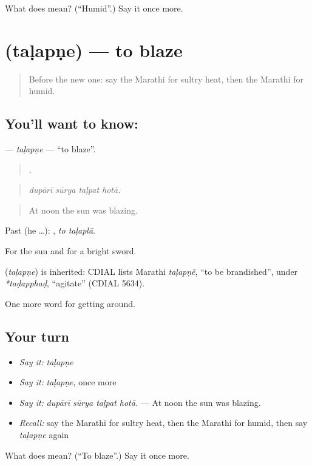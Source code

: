 \begin{tcolorbox}[breakable,colback=teal!4,colframe=teal!35!black,title={Before you move on}]
What does  mean? (\textquotedblleft{}Humid\textquotedblright{}.) Say it once more.
\end{tcolorbox}
\section[\texorpdfstring{\mr{तळपणे} (taḷapṇe)}{तळपणे (taḷapṇe)}]{ (taḷapṇe) — to blaze}

\label{lesson:MR-C436-talapne}



\begin{quote}
Before the new one: say the Marathi for sultry heat, then the Marathi for humid.
\end{quote}

\subsection*{You'll want to know: }
\textbf{} — \emph{taḷapṇe} — \textquotedblleft{}to blaze\textquotedblright{}.

\begin{quote}
   .
\end{quote}

\begin{quote}
\emph{dupārī sūrya taḷpat hotā.}
\end{quote}

\begin{quote}
At noon the sun was blazing.
\end{quote}

Past (he …):  , \emph{to taḷaplā}.

For the sun and for a bright sword.

\begin{cousinweb}
\textbf{} (\emph{taḷapṇe}) is inherited: CDIAL lists Marathi \emph{taḷapṇẽ}, \textquotedblleft{}to be brandished\textquotedblright{}, under \emph{*taḍapphaḍ}, \textquotedblleft{}agitate\textquotedblright{} (CDIAL 5634).
\end{cousinweb}

\begin{grammarlens}[title={What you've built}]
One more word for getting around.
\end{grammarlens}

\subsection*{Your turn}
\begin{itemize}
\raggedright
  \item \emph{Say it:} \emph{taḷapṇe}
  \item \emph{Say it:} \emph{taḷapṇe}, once more
  \item \emph{Say it:} \emph{dupārī sūrya taḷpat hotā.} — At noon the sun was blazing.
  \item \emph{Recall:} say the Marathi for sultry heat, then the Marathi for humid, then say \emph{taḷapṇe} again
\end{itemize}

\begin{tcolorbox}[breakable,colback=teal!4,colframe=teal!35!black,title={Before you move on}]
What does  mean? (\textquotedblleft{}To blaze\textquotedblright{}.) Say it once more.
\end{tcolorbox}
